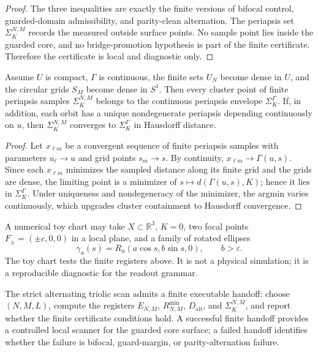 \begin{proof}
The three inequalities are exactly the finite versions of bifocal control, guarded-domain admissibility, and parity-clean alternation.  The periapsis set $\Sigma_K^{N,M}$ records the measured outside surface points.  No sample point lies inside the guarded core, and no bridge-promotion hypothesis is part of the finite certificate.  Therefore the certificate is local and diagnostic only.
\end{proof}

\begin{proposition}
\label{prop:finite-periapsis-estimator-consistency}
Assume $U$ is compact, $\Gamma$ is continuous, the finite sets $U_N$ become dense in $U$, and the circular grids $S_M$ become dense in $S^1$.  Then every cluster point of finite periapsis samples $\Sigma_K^{N,M}$ belongs to the continuous periapsis envelope $\Sigma_K^\Gamma$.  If, in addition, each orbit has a unique nondegenerate periapsis depending continuously on $u$, then $\Sigma_K^{N,M}$ converges to $\Sigma_K^\Gamma$ in Hausdorff distance.
\end{proposition}

\begin{proof}
Let $x_{\ell m}$ be a convergent sequence of finite periapsis samples with parameters $u_\ell\to u$ and grid points $s_m\to s$.  By continuity, $x_{\ell m}\to\Gamma(u,s)$.  Since each $x_{\ell m}$ minimizes the sampled distance along its finite grid and the grids are dense, the limiting point is a minimizer of $s\mapsto d(\Gamma(u,s),K)$; hence it lies in $\Sigma_K^\Gamma$.  Under uniqueness and nondegeneracy of the minimizer, the argmin varies continuously, which upgrades cluster containment to Hausdorff convergence.
\end{proof}

\begin{remark}
\label{rem:executable-toy-chart}
A numerical toy chart may take $X\subset\mathbb R^3$, $K=0$, two focal points $F_\pm=(\pm c,0,0)$ in a local plane, and a family of rotated ellipses
\[
\gamma_u(s)=R_u(a\cos s,b\sin s,0),
\qquad
b>\varepsilon .
\]
The toy chart tests the finite registers above.  It is not a physical simulation; it is a reproducible diagnostic for the readout grammar.
\end{remark}

\begin{theorem}
\label{thm:executable-orbit-scan-handoff}
The strict alternating triolic scan admits a finite executable handoff: choose $(N,M,L)$, compute the registers $E_{N,M}$, $R_{N,M}^{\min}$, $D_{\mathrm{alt}}$, and $\Sigma_K^{N,M}$, and report whether the finite certificate conditions hold.  A successful finite handoff provides a controlled local scanner for the guarded core surface; a failed handoff identifies whether the failure is bifocal, guard-margin, or parity-alternation failure.
\end{theorem}

